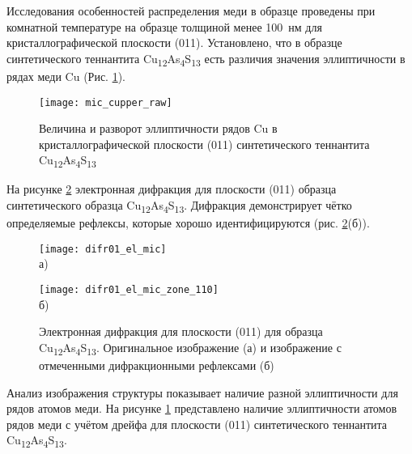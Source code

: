 Исследования особенностей распределения меди в образце проведены при комнатной температуре на образце толщиной менее 100~нм для кристаллографической плоскости (011).
Установлено, что в образце синтетического теннантита Cu\textsubscript{12}As\textsubscript{4}S\textsubscript{13} есть различия значения эллиптичности в рядах меди Cu (Рис. \ref{img:mic}).

\begin{figure}[h!]
  \begin{minipage}[ht]{0.9\linewidth}\centering
    \texttt{[image: mic\_cupper\_raw]}
  \end{minipage}

      \caption[Величина и разворот эллиптичности рядов Cu в кристаллографической плоскости (011) синтетического теннантита Cu\textsubscript{12}As\textsubscript{4}S\textsubscript{13}]{Величина и разворот эллиптичности рядов Cu в кристаллографической плоскости (011) синтетического теннантита Cu\textsubscript{12}As\textsubscript{4}S\textsubscript{13}}
    \label{img:mic}
\end{figure}


На рисунке \ref{img:mic2} электронная дифракция для плоскости (011) образца синтетического образца Cu\textsubscript{12}As\textsubscript{4}S\textsubscript{13}.
Дифракция демонстрирует чётко определяемые рефлексы, которые хорошо идентифицируются (рис. \ref{img:mic2}(б)).

\begin{figure}[ph!]
\centering
  \begin{minipage}[ht]{0.7\linewidth}\centering
    \texttt{[image: difr01\_el\_mic]} \\ а)
  \end{minipage}
  \vfill
  \begin{minipage}[ht]{0.7\linewidth}\centering
    \texttt{[image: difr01\_el\_mic\_zone\_110]} \\ б)
  \end{minipage}
  \caption[Электронная дифракция для плоскости (011) для образца Cu\textsubscript{12}As\textsubscript{4}S\textsubscript{13}. Оригинальное изображение (а) и изображение с отмеченными дифракционными рефлексами (б)]{Электронная дифракция для плоскости (011) для образца Cu\textsubscript{12}As\textsubscript{4}S\textsubscript{13}. Оригинальное изображение (а) и изображение с отмеченными дифракционными рефлексами (б)}
    \label{img:mic2}
\end{figure}

Анализ изображения структуры показывает наличие разной эллиптичности для рядов атомов меди. На рисунке \ref{img:mic} представлено наличие эллиптичности атомов рядов меди с учётом дрейфа для плоскости (011) синтетического теннантита Cu\textsubscript{12}As\textsubscript{4}S\textsubscript{13}.




